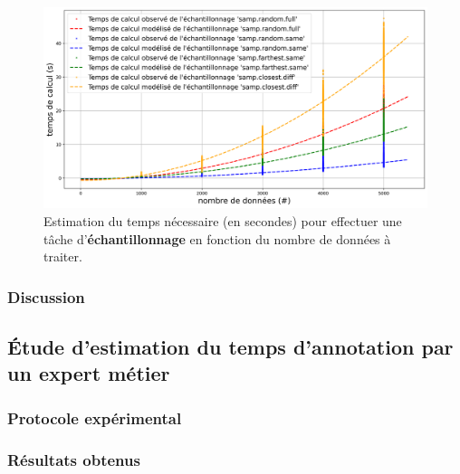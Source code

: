 			\begin{figure}[!htb]
				\centering
				\includegraphics[width=\textwidth]{figures/etude-temps-calcul-modelisation-4samp}
				\caption{Estimation du temps nécessaire (en secondes) pour effectuer une tâche d'\textbf{échantillonnage} en fonction du nombre de données à traiter.}
				\label{figure:4.3.1-ETUDE-COUTS-TEMPS-CALCUL-MODELISATION-SAMPLING}
			\end{figure}
			

		\subsubsection{Discussion}
		
	
	\subsection{Étude d'estimation du temps d'annotation par un expert métier}
	\label{section:4.3.2-HYPOTHESE-COUTS-TEMPS-ANNOTATION}
	
		\subsubsection{Protocole expérimental}
		
										

		\subsubsection{Résultats obtenus}
		
